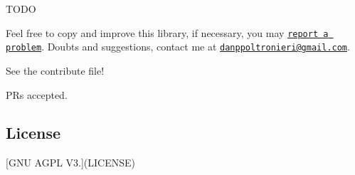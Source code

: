 T\+O\+DO

Feel free to copy and improve this library, if necessary, you may \href{https://github.com/dpoltronieri/Canary/issues/new}{\tt report a problem}. Doubts and suggestions, contact me at \href{mailto:danppoltronieri@gmail.com}{\tt danppoltronieri@gmail.\+com}.

See the contribute file!

P\+Rs accepted.

\subsection*{License}

\mbox{[}G\+NU A\+G\+PL V3.\mbox{]}(L\+I\+C\+E\+N\+SE) 